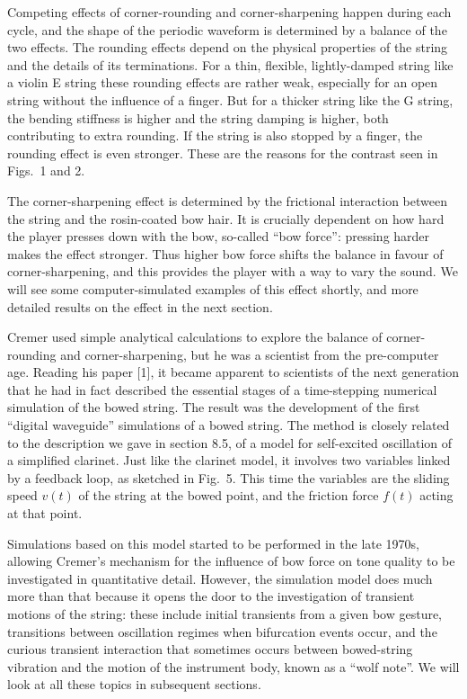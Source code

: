   Competing effects of corner-rounding and corner-sharpening happen during each 
  cycle, and the shape of the periodic waveform is determined by a balance of 
  the two effects. The rounding effects depend on the physical properties of 
  the string and the details of its terminations. For a thin, flexible, 
  lightly-damped string like a violin E string these rounding effects are 
  rather weak, especially for an open string without the influence of a finger. 
  But for a thicker string like the G string, the bending stiffness is higher 
  and the string damping is higher, both contributing to extra rounding. If the 
  string is also stopped by a finger, the rounding effect is even stronger. 
  These are the reasons for the contrast seen in Figs.\ 1 and 2. 

  The corner-sharpening effect is determined by the frictional interaction 
  between the string and the rosin-coated bow hair. It is crucially dependent 
  on how hard the player presses down with the bow, so-called “bow force”: 
  pressing harder makes the effect stronger. Thus higher bow force shifts the 
  balance in favour of corner-sharpening, and this provides the player with a 
  way to vary the sound. We will see some computer-simulated examples of this 
  effect shortly, and more detailed results on the effect in the next section. 

  Cremer used simple analytical calculations to explore the balance of 
  corner-rounding and corner-sharpening, but he was a scientist from the 
  pre-computer age. Reading his paper [1], it became apparent to scientists of 
  the next generation that he had in fact described the essential stages of a 
  time-stepping numerical simulation of the bowed string. The result was the 
  development of the first “digital waveguide” simulations of a bowed string. 
  The method is closely related to the description we gave in section 8.5, of a 
  model for self-excited oscillation of a simplified clarinet. Just like the 
  clarinet model, it involves two variables linked by a feedback loop, as 
  sketched in Fig.\ 5. This time the variables are the sliding speed $v(t)$ of 
  the string at the bowed point, and the friction force $f(t)$ acting at that 
  point. 


  Simulations based on this model started to be performed in the late 1970s, 
  allowing Cremer’s mechanism for the influence of bow force on tone quality to 
  be investigated in quantitative detail. However, the simulation model does 
  much more than that because it opens the door to the investigation of 
  transient motions of the string: these include initial transients from a 
  given bow gesture, transitions between oscillation regimes when bifurcation 
  events occur, and the curious transient interaction that sometimes occurs 
  between bowed-string vibration and the motion of the instrument body, known 
  as a “wolf note”. We will look at all these topics in subsequent sections. 

